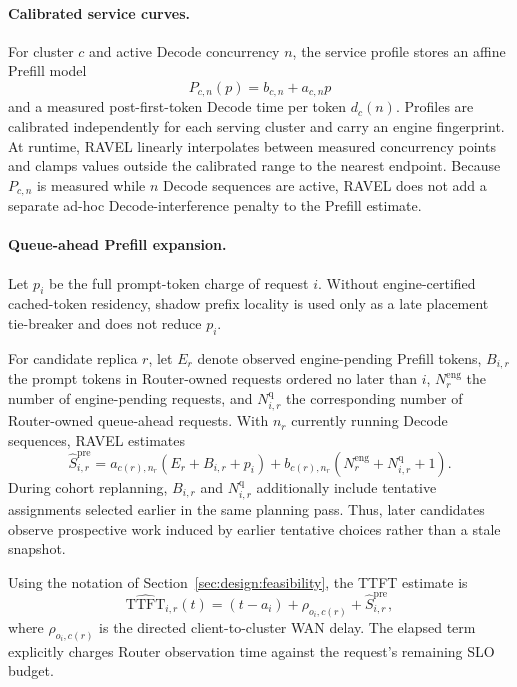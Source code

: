 \documentclass[letterpaper,twocolumn,10pt]{article}
\begin{document}
\paragraph{Calibrated service curves.}
For cluster $c$ and active Decode concurrency $n$, the service profile stores
an affine Prefill model
\begin{equation}
    P_{c,n}(p)=b_{c,n}+a_{c,n}p
    \label{eq:appendix:prefill-profile}
\end{equation}
and a measured post-first-token Decode time per token $d_c(n)$.
Profiles are calibrated independently for each serving cluster and carry an
engine fingerprint.
At runtime, RAVEL linearly interpolates between measured concurrency points
and clamps values outside the calibrated range to the nearest endpoint.
Because $P_{c,n}$ is measured while $n$ Decode sequences are active, RAVEL
does not add a separate ad-hoc Decode-interference penalty to the Prefill
estimate.

\paragraph{Queue-ahead Prefill expansion.}
Let $p_i$ be the full prompt-token charge of request $i$.
Without engine-certified cached-token residency, shadow prefix locality is used
only as a late placement tie-breaker and does not reduce $p_i$.

For candidate replica $r$, let $E_r$ denote observed engine-pending Prefill
tokens, $B_{i,r}$ the prompt tokens in Router-owned requests ordered no later
than $i$, $N_r^{\mathrm{eng}}$ the number of engine-pending requests, and
$N_{i,r}^{\mathrm{q}}$ the corresponding number of Router-owned queue-ahead
requests.
With $n_r$ currently running Decode sequences, RAVEL estimates
\begin{equation}
    \widehat{S}^{\mathrm{pre}}_{i,r}
    =
    a_{c(r),n_r}
    \left(E_r+B_{i,r}+p_i\right)
    +
    b_{c(r),n_r}
    \left(N_r^{\mathrm{eng}}+N_{i,r}^{\mathrm{q}}+1\right).
    \label{eq:appendix:prefill-service}
\end{equation}
During cohort replanning, $B_{i,r}$ and $N_{i,r}^{\mathrm{q}}$ additionally
include tentative assignments selected earlier in the same planning pass.
Thus, later candidates observe prospective work induced by earlier tentative
choices rather than a stale snapshot.

Using the notation of Section~\ref{sec:design:feasibility}, the TTFT estimate
is
\begin{equation}
    \widehat{\mathrm{TTFT}}_{i,r}(t)
    =
    (t-a_i)
    +
    \rho_{o_i,c(r)}
    +
    \widehat{S}^{\mathrm{pre}}_{i,r},
    \label{eq:appendix:ttft}
\end{equation}
where $\rho_{o_i,c(r)}$ is the directed client-to-cluster WAN delay.
The elapsed term explicitly charges Router observation time against the
request's remaining SLO budget.
\end{document}
